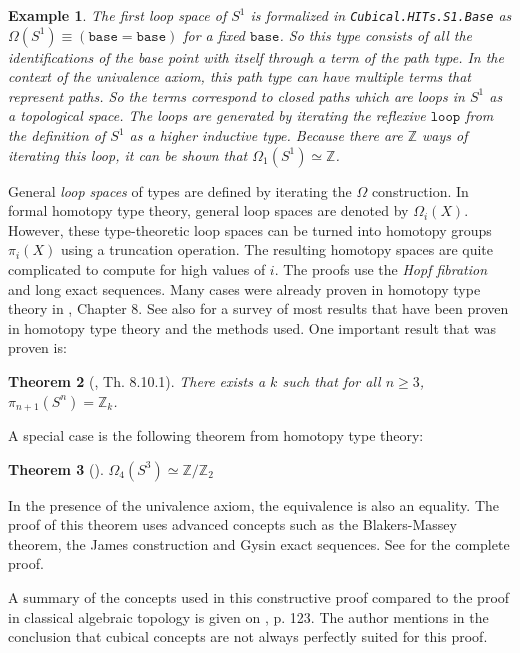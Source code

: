 \documentclass[12pt,a4paper,twoside,xetex]{book} %
\newcommand{\keyword}[1]{\emph{#1}\index{#1}}
\newtheorem{theorem}{Theorem}[section]
\newtheorem{example}[theorem]{Example}
\newcommand{\op}[1]{\mathtt{#1}}
\begin{document}
\begin{example}
The first loop space of $S^1$ is formalized in \texttt{Cubical.HITs.S1.Base} 
as $\Omega (S^1) \equiv (\op{base} = \op{base})$ for a fixed
$\op{base}$. So this type consists of all the identifications of the base 
point with itself through a term of the path type. In the context of the 
univalence axiom, this path type can have multiple terms that represent paths. 
So the terms correspond to closed paths which are loops in $S^1$ as a 
topological space. The loops are generated by iterating the reflexive 
$\op{loop}$ from the definition of $S^1$ as a higher inductive type. Because 
there are $\mathbb{Z}$ ways of iterating this loop, it can be shown that 
$\Omega_1 (S^1) \simeq \mathbb{Z}$. 
\end{example}


General \keyword{loop spaces} of types 
are defined by iterating the $\Omega$ construction. In formal homotopy type 
theory, general loop spaces are denoted by $\Omega_i (X)$. However, these type-theoretic loop spaces can be turned into homotopy groups $\pi_i(X)$ using a truncation operation. 
The resulting homotopy spaces are quite complicated to compute for high values of $i$. The proofs use the \keyword{Hopf fibration} and long exact sequences. Many cases were already proven in homotopy type theory in \cite{Voevodsky2013}, Chapter 8. See also \cite{Licata2013May} for a survey of most results that have been proven in 
homotopy type theory and the methods used. One important result that was proven 
is:

\begin{theorem}[\cite{Voevodsky2013}, Th. 8.10.1]
 There exists a $k$ such that for all $n \geq 3$, $\pi_{n+1}(S^n) = 
\mathbb{Z}_k$.
\end{theorem}

A special case is the following theorem from homotopy type theory:

\begin{theorem}[\cite{Brunerie2016}]
$\Omega_4 ( S^3 ) \simeq \mathbb{Z} / \mathbb{Z}_2$
\end{theorem}

In the presence of the univalence axiom, the equivalence is also an equality. The proof of this theorem uses advanced concepts such as the Blakers-Massey 
theorem, the James construction and Gysin exact sequences. See 
\cite{Brunerie2016} for the complete proof.

A summary of the concepts used in this constructive proof compared to the proof 
in classical algebraic topology is given on \cite{Brunerie2016}, p. 123. The 
author mentions in the conclusion that cubical concepts are not always perfectly 
suited for this proof. 
\end{document}
